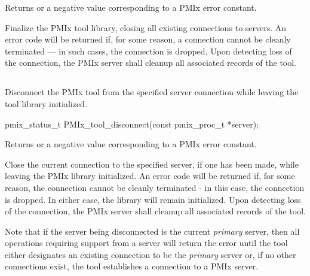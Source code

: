 Returns  or a negative value corresponding to a \ac{PMIx} error constant.

\descr

Finalize the \ac{PMIx} tool library, closing all existing connections to
servers.
An error code will be returned if, for some reason, a connection cannot be
cleanly terminated --- in such cases, the connection is dropped. Upon
detecting loss of the connection, the \ac{PMIx} server shall cleanup all
associated records of the tool.


\subsection{}

\summary

Disconnect the \ac{PMIx} tool from the specified server connection while leaving the tool library initialized.

\format

\cspecificstart
\begin{codepar}
pmix_status_t
PMIx_tool_disconnect(const pmix_proc_t *server);
\end{codepar}
\cspecificend

\begin{arglist}
\end{arglist}

Returns  or a negative value corresponding to a PMIx error constant.

\descr

Close the current connection to the specified server, if one has been made, while leaving the \ac{PMIx} library initialized. An error code will be returned if, for some reason, the connection cannot be cleanly terminated - in this case, the connection is dropped. In either case, the library will remain initialized.  Upon
detecting loss of the connection, the \ac{PMIx} server shall cleanup all
associated records of the tool.


Note that if the server being disconnected is the current \emph{primary} server, then all operations requiring support from a server will return the  error until the tool either designates an existing connection to be the \emph{primary} server or, if no other connections exist, the tool establishes a connection to a \ac{PMIx} server.


